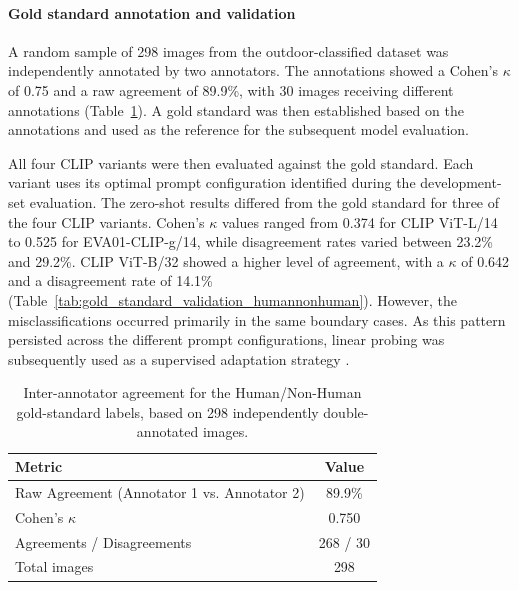 \documentclass[11pt]{article}
\renewcommand{\_}{\textunderscore\allowbreak{}}
\begin{document}
\paragraph{Gold standard annotation and validation}

A random sample of 298 images from the outdoor-classified dataset was independently annotated by two annotators. The annotations showed a Cohen's $\kappa$ of 0.75 and a raw agreement of 89.9\%, with 30 images receiving different annotations (Table~\ref{tab:interannotator_humannonhuman}). A gold standard was then established based on the annotations and used as the reference for the subsequent model evaluation.

All four CLIP variants were then evaluated against the gold standard. Each variant uses its optimal prompt configuration identified during the development-set evaluation. The zero-shot results differed from the gold standard for three of the four CLIP variants. Cohen's $\kappa$ values ranged from 0.374 for CLIP ViT-L/14 to 0.525 for EVA01-CLIP-g/14, while disagreement rates varied between 23.2\% and 29.2\%. CLIP ViT-B/32 showed a higher level of agreement, with a $\kappa$ of 0.642 and a disagreement rate of 14.1\% (Table~\ref{tab:gold_standard_validation_humannonhuman}). However, the misclassifications occurred primarily in the same boundary cases. As this pattern persisted across the different prompt configurations, linear probing was subsequently used as a supervised adaptation strategy \citep{radford_learning_2021}.

\begin{table}[htbp]
\centering
\caption{Inter-annotator agreement for the Human/Non-Human gold-standard labels, based on 298 independently double-annotated images.}
\label{tab:interannotator_humannonhuman}
\begin{tabular}{@{}lc@{}}
\toprule
\textbf{Metric} & \textbf{Value} \\
\midrule
Raw Agreement (Annotator 1 vs. Annotator 2) & 89.9\% \\
Cohen's $\kappa$                             & 0.750 \\
Agreements / Disagreements                    & 268 / 30 \\
Total images                                  & 298 \\
\bottomrule
\end{tabular}
\end{table}
\end{document}
